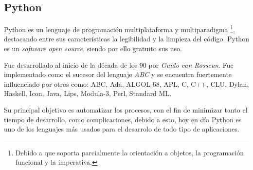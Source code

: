\subsection*{Python}
Python es un lenguaje de programación multiplataforma y multiparadigma \footnote{Debido a que soporta parcialmente la orientación a objetos, la programación funcional y la imperativa.}, destacando entre sus características la legibilidad y la limpieza del código. Python es un \textit{software open source}, siendo por ello gratuito sus uso.

Fue desarrollado al inicio de la década de los 90 por \textit{Guido van Rosseun}. Fue implementado como el sucesor del lenguaje \textit{ABC} y se encuentra fuertemente influenciado por otros como: ABC, Ada, ALGOL 68, APL, C, C++, CLU, Dylan, Haskell, Icon, Java,
Lips, Modula-3, Perl, Standard ML.

Su principal objetivo es automatizar los procesos, con el fin de minimizar tanto el tiempo de desarrollo, como complicaciones, debido a esto, hoy en día Python es uno de los lenguajes más usados para el desarrolo de todo tipo de aplicaciones.

